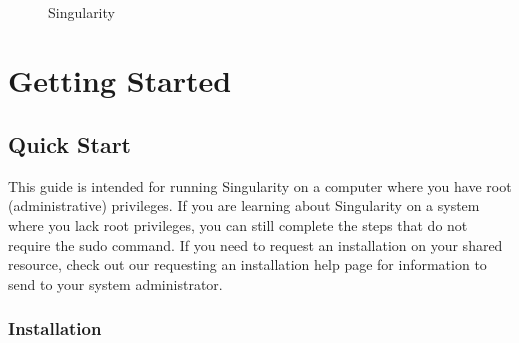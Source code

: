 \documentclass[a4paper]{article}
\date{\vspace{-5ex}}
\begin{document}
\begin{figure}
\centering
\includegraphics[width=0.5,height=0.5]{logo.png}
\caption{Singularity}
\end{figure}

\justify


\section{Getting Started}
\subsection{Quick Start}
\label{sec:quickstart}

This guide is intended for running Singularity on a computer where you have root (administrative) privileges. If you are learning about Singularity on a system where you lack root privileges, you can still complete the steps that do not require the sudo command. If you need to request an installation on your shared resource, check out our requesting an installation help page for information to send to your system administrator.

\newpage


\tableofcontents
\newpage

\subsubsection{Installation}
\end{document}
